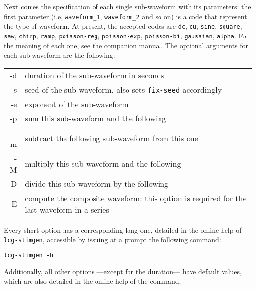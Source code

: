 Next comes the specification of each single sub-waveform with its
parameters: the first parameter (i.e, \verb+waveform_1+,
\verb+waveform_2+ and so on) is a code that represent the type of
waveform. At present, the accepted codes are \verb+dc+, \verb+ou+,
\verb+sine+, \verb+square+, \verb+saw+, \verb+chirp+, \verb+ramp+,
\verb+poisson-reg+, \verb+poisson-exp+, \verb+poisson-bi+,
\verb+gaussian+, \verb+alpha+. For the meaning of each one, see the
companion manual. The optional arguments for each sub-waveform are the
following:
\begin{table}[h!!]
\begin{tabular}{r|l}
-d & duration of the sub-waveform in seconds \\
-s & seed of the sub-waveform, also sets \verb+fix-seed+ accordingly \\
-e & exponent of the sub-waveform \\
-p & sum this sub-waveform and the following \\
-m & subtract the following sub-waveform from this one \\
-M & multiply this sub-waveform and the following \\
-D & divide this sub-waveform by the following \\
-E & compute the composite waveform: this option is required for the last waveform in a series
\end{tabular}
\label{tab:optargs}
\end{table}
\newline
Every short option has a corresponding long one, detailed in the
online help of \verb+lcg-stimgen+, accessible by issuing at a prompt the
following command:
\begin{lstlisting}
lcg-stimgen -h
\end{lstlisting}
Additionally, all other options ---except for the duration--- have default
values, which are also detailed in the online help of the command.

